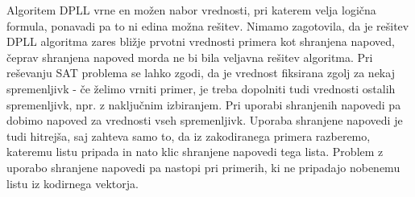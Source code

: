 \documentclass[12pt,a4paper]{article}
\begin{document}
Algoritem DPLL vrne en možen nabor vrednosti, pri katerem velja logična formula, ponavadi pa to ni edina možna rešitev.
Nimamo zagotovila, da je rešitev DPLL algoritma zares bližje prvotni vrednosti primera kot shranjena napoved, čeprav shranjena napoved morda ne bi bila veljavna rešitev algoritma.
Pri reševanju SAT problema se lahko zgodi, da je vrednost fiksirana zgolj za nekaj spremenljivk - če želimo vrniti primer, je treba dopolniti tudi vrednosti ostalih spremenljivk, npr. z naključnim izbiranjem.
Pri uporabi shranjenih napovedi pa dobimo napoved za vrednosti vseh spremenljivk.
Uporaba shranjene napovedi je tudi hitrejša, saj zahteva samo to, da iz zakodiranega primera razberemo, kateremu listu pripada in nato klic shranjene napovedi tega lista.
Problem z uporabo shranjene napovedi pa nastopi pri primerih, ki ne pripadajo nobenemu listu iz kodirnega vektorja.

\end{document}
